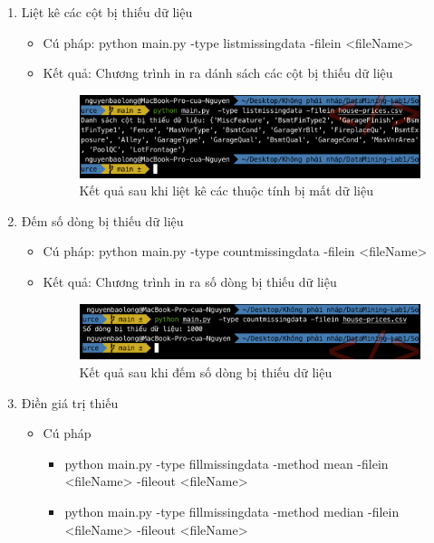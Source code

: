 \documentclass[a4paper, 12pt]{article}
\begin{document}
\begin{enumerate}
    \item Liệt kê các cột bị thiếu dữ liệu
    \begin{itemize}
        \item Cú pháp: python main.py -type listmissingdata -filein <fileName>
        \item Kết quả: Chương trình in ra dánh sách các cột bị thiếu dữ liệu
        \begin{figure}[H]
            \begin{center}
                \includegraphics[scale = 0.75]{images/listmissingdata.png}
                \caption{Kết quả sau khi liệt kê các thuộc tính bị mất dữ liệu}
            \end{center}
        \end{figure}
    \end{itemize}

    \item Đếm số dòng bị thiếu dữ liệu
    \begin{itemize}
        \item Cú pháp: python main.py -type countmissingdata -filein <fileName>
        \item Kết quả: Chương trình in ra số dòng bị thiếu dữ liệu
        \begin{figure}[H]
            \begin{center}
                \includegraphics[scale = 0.75]{images/missingdata.png}
                \caption{Kết quả sau khi đếm số dòng bị thiếu dữ liệu}
            \end{center}
        \end{figure}
    \end{itemize}

    \item Điền giá trị thiếu
    \begin{itemize}
        \item Cú pháp
        \begin{itemize}
            \item python main.py -type fillmissingdata -method mean -filein <fileName> -fileout <fileName>
            \item python main.py -type fillmissingdata -method median -filein <fileName> -fileout <fileName>
        \end{itemize}


\end{itemize}
\end{enumerate}
\end{document}
